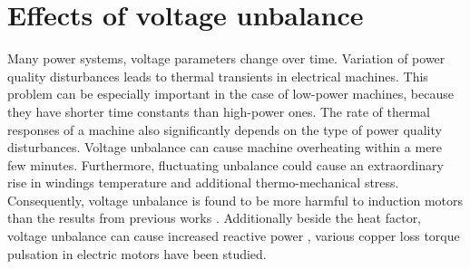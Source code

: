 	\section{Effects of voltage unbalance}
	
	Many power systems, voltage parameters change over time. Variation of power quality disturbances leads to thermal transients in electrical machines. This problem can be especially important in the case of low-power machines, because they have shorter time constants than high-power ones. The rate of thermal responses of a machine also significantly depends on the type of power quality disturbances. Voltage unbalance can cause  machine  overheating  within  a  mere  few  minutes. Furthermore,  fluctuating  unbalance  could  cause  an  extraordinary rise  in  windings  temperature  and  additional  thermo-mechanical stress.  Consequently,  voltage  unbalance  is  found  to  be  more harmful to induction motors than the results from previous works \cite{gnacinski2019induction}. Additionally beside the heat factor, voltage unbalance can cause increased reactive power \cite{savaghebi2012secondary}, various copper loss \cite{siddique2004effects} torque pulsation in electric motors \cite{brekken2005control} have been studied.

	

